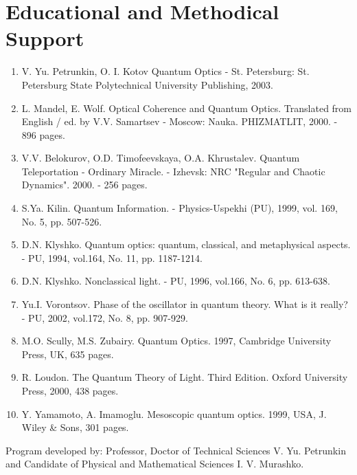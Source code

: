 \section{Educational and Methodical Support}
\begin{enumerate}
\item V. Yu. Petrunkin, O. I. Kotov Quantum Optics -
  St. Petersburg: St. Petersburg State Polytechnical University Publishing, 2003.  
\item L. Mandel, E. Wolf. Optical Coherence and Quantum Optics. Translated from English / ed. by V.V. Samartsev - Moscow:
  Nauka. PHIZMATLIT, 2000. - 896 pages.
\item V.V. Belokurov, O.D. Timofeevskaya,
  O.A. Khrustalev. Quantum Teleportation - Ordinary Miracle. - Izhevsk:
  NRC "Regular and Chaotic Dynamics". 2000. - 256 pages.
\item S.Ya. Kilin. Quantum Information. - Physics-Uspekhi (PU), 1999, vol. 169,
  No. 5, pp. 507-526.
\item D.N. Klyshko. Quantum optics: quantum,
  classical, and metaphysical aspects. - PU, 1994, vol.164, No. 11,
  pp. 1187-1214.
\item D.N. Klyshko. Nonclassical light. - PU, 1996,
  vol.166, No. 6, pp. 613-638.
\item Yu.I. Vorontsov. Phase of the oscillator in quantum
  theory. What is it really? - PU, 2002, vol.172, No. 8,
  pp. 907-929.
\item M.O. Scully, M.S. Zubairy. Quantum Optics. 1997,
  Cambridge University Press, UK, 635 pages.
\item R. Loudon. The Quantum Theory of Light. Third
  Edition. Oxford University Press, 2000, 438 pages.
\item Y. Yamamoto, A. Imamoglu. Mesoscopic quantum
  optics. 1999, USA, J. Wiley \& Sons, 301 pages.
\end{enumerate}

Program developed by: Professor, Doctor of Technical Sciences V. Yu. Petrunkin and
Candidate of Physical and Mathematical Sciences I. V. Murashko.

